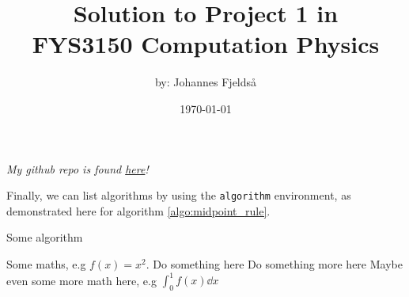 \documentclass[english,notitlepage]{article}  %
\begin{document}
\title{Solution to Project 1 in \\
\huge FYS3150 Computation Physics \\}      %
\author{by: Johannes Fjeldså}
\date{\today}                      %
\noaffiliation                            %


\maketitle 
    
\textit{My github repo is found \href{https://github.com/Johannesfjeldsaa/FYS3150/tree/Project1}{here}!}
    
\newpage


\newpage


\newpage


\newpage


\newpage


\newpage



\newpage


\newpage


\newpage



Finally, we can list algorithms by using the \texttt{algorithm} environment, as demonstrated here for algorithm \ref{algo:midpoint_rule}.
\begin{algorithm}[H]
    \caption{Some algorithm}\label{algo:midpoint_rule}
    \begin{algorithmic}
        \State Some maths, e.g $f(x) = x^2$.  
        \State Do something here 
        \EndFor
        \State Do something more here 
        \EndWhile
        \State Maybe even some more math here, e.g $\int_0^1 f(x) \dd x$
    \end{algorithmic}
\end{algorithm}
   
\end{document}
